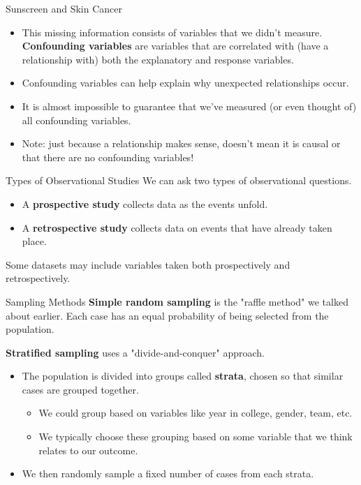 \begin{frame}{Sunscreen and Skin Cancer}
    \begin{itemize}
        \item This missing information consists of variables that we didn't measure.
        \textbf{Confounding variables} are variables that are correlated with (have a relationship with) both the explanatory and response variables.
        \item Confounding variables can help explain why unexpected relationships occur.
        \item It is almost impossible to guarantee that we've measured (or even thought of) all confounding variables.
        \item Note: just because a relationship makes sense, doesn't mean it is causal or that there are no confounding variables!
    \end{itemize}
\end{frame}

\begin{frame}{Types of Observational Studies}
    We can ask two types of observational questions. 
    \begin{itemize}
        \item A \textbf{prospective study} collects data as the events unfold.
        \item A \textbf{retrospective study} collects data on events that have already taken place. 
    \end{itemize}
    
    Some datasets may include variables taken both prospectively and retrospectively. 
\end{frame}

\begin{frame}{Sampling Methods}
    \textbf{Simple random sampling} is the "raffle method" we talked about earlier. Each case has an equal probability of being selected from the population.
    
    \vspace{18pt}
    \textbf{Stratified sampling} uses a "divide-and-conquer" approach. 
    \begin{itemize}
        \item The population is divided into groups called \textbf{strata}, chosen so that similar cases are grouped together.
        \begin{itemize}
            \item We could group based on variables like year in college, gender, team, etc.
            \item We typically choose these grouping based on some variable that we think relates to our outcome. 
        \end{itemize}
        \item We then randomly sample a fixed number of cases from each strata. 
    \end{itemize}
\end{frame}

